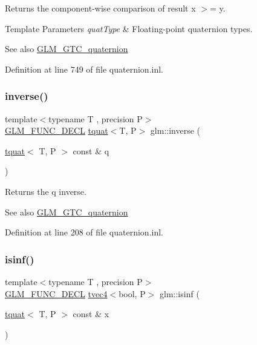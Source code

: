 Returns the component-\/wise comparison of result x $>$= y.


\begin{DoxyTemplParams}{Template Parameters}
{\em quat\+Type} & Floating-\/point quaternion types.\\
\hline
\end{DoxyTemplParams}
\begin{DoxySeeAlso}{See also}
\mbox{\hyperlink{group__gtc__quaternion}{G\+L\+M\+\_\+\+G\+T\+C\+\_\+quaternion}} 
\end{DoxySeeAlso}


Definition at line 749 of file quaternion.\+inl.

\mbox{\label{group__gtc__quaternion_ga5f47300c024c2d809944e6ac661d6d14}} 
\subsubsection{\texorpdfstring{inverse()}{inverse()}}
{\footnotesize\ttfamily template$<$typename T , precision P$>$ \\
\mbox{\hyperlink{setup_8hpp_ab2d052de21a70539923e9bcbf6e83a51}{G\+L\+M\+\_\+\+F\+U\+N\+C\+\_\+\+D\+E\+CL}} \mbox{\hyperlink{structglm_1_1tquat}{tquat}}$<$T, P$>$ glm\+::inverse (\begin{DoxyParamCaption}\item[{\mbox{\hyperlink{structglm_1_1tquat}{tquat}}$<$ T, P $>$ const \&}]{q }\end{DoxyParamCaption})}

Returns the q inverse.

\begin{DoxySeeAlso}{See also}
\mbox{\hyperlink{group__gtc__quaternion}{G\+L\+M\+\_\+\+G\+T\+C\+\_\+quaternion}} 
\end{DoxySeeAlso}


Definition at line 208 of file quaternion.\+inl.

\mbox{\label{group__gtc__quaternion_ga0a850f06736d25887536d0da88e63c70}} 
\subsubsection{\texorpdfstring{isinf()}{isinf()}}
{\footnotesize\ttfamily template$<$typename T , precision P$>$ \\
\mbox{\hyperlink{setup_8hpp_ab2d052de21a70539923e9bcbf6e83a51}{G\+L\+M\+\_\+\+F\+U\+N\+C\+\_\+\+D\+E\+CL}} \mbox{\hyperlink{structglm_1_1tvec4}{tvec4}}$<$bool, P$>$ glm\+::isinf (\begin{DoxyParamCaption}\item[{\mbox{\hyperlink{structglm_1_1tquat}{tquat}}$<$ T, P $>$ const \&}]{x }\end{DoxyParamCaption})}

